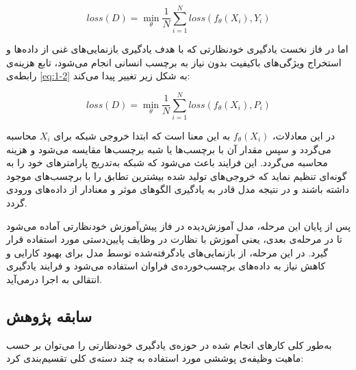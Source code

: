 \begin{equation}
\label{eq:1-2}
loss(D) = \min_{\theta} \frac{1}{N} \sum_{i=1}^{N} loss(f_θ(X_i), Y_i)
\end{equation}

اما در فاز نخست یادگیری خودنظارتی که با هدف یادگیری بازنمایی‌های غنی از داده‌ها و استخراج ویژگی‌های باکیفیت بدون نیاز به برچسب انسانی انجام می‌شود، تابع هزینه‌ی رابطه‌ی \ref{eq:1-2} به شکل زیر تغییر پیدا می‌کند:

\begin{equation}
\label{eq:2-2}
loss(D) = \min_{\theta} \frac{1}{N} \sum_{i=1}^{N} loss(f_θ(X_i), P_i)
\end{equation}

در این معادلات، $f_θ(X_i)$ به این معنا است که ابتدا خروجی شبکه برای $X_i$ محاسبه می‌گردد و سپس مقدار آن با برچسب‌ها یا شبه برچسب‌ها مقایسه می‌شود و هزینه محاسبه می‌گردد. این فرایند باعث می‌شود که شبکه به‌تدریج پارامترهای خود را به گونه‌ای تنظیم نماید که خروجی‌های تولید شده بیشترین تطابق را با برچسب‌های موجود داشته باشند و در نتیجه مدل قادر به یادگیری الگوهای موثر و معنادار از داده‌های ورودی گردد.

پس از پایان این مرحله، مدل آموزش‌دیده در فاز پیش‌آموزش خودنظارتی آماده می‌شود تا در مرحله‌ی بعدی، یعنی آموزش با نظارت در وظایف پایین‌دستی مورد استفاده قرار گیرد. در این مرحله، از بازنمایی‌های یادگرفته‌شده توسط مدل برای بهبود کارایی و کاهش نیاز به داده‌های برچسب‌خورده‌ی فراوان استفاده می‌شود و فرایند یادگیری انتقالی به اجرا درمی‌آید.

\subsection{سابقه پژوهش}

به‌طور کلی کارهای انجام شده در حوزه‌ی یادگیری خودنظارتی را می‌توان بر حسب ماهیت وظیفه‌ی پوششی مورد استفاده به چند دسته‌ی کلی تقسیم‌بندی کرد:

